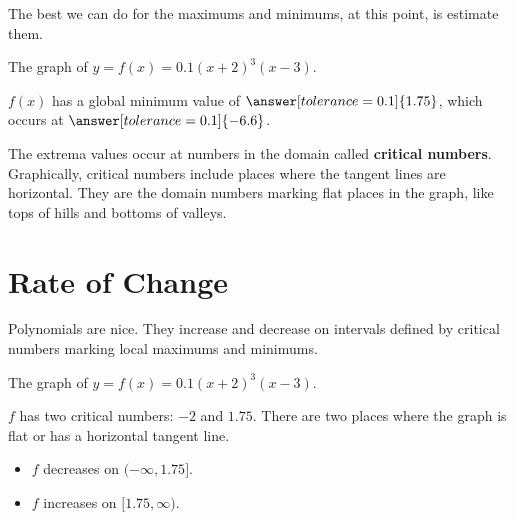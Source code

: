 \documentclass{ximera}
\begin{document}
The best we can do for the maximums and minimums, at this point, is estimate them.







\begin{example}

The graph of $y = f(x) = 0.1(x+2)^3(x-3)$.



\begin{center}
\end{center}



$f(x)$ has a global minimum value of $\answer[tolerance=0.1]{1.75}$, which occurs at $\answer[tolerance=0.1]{-6.6}$.


\end{example}




The extrema values occur at numbers in the domain called \textbf{critical numbers}.  Graphically, critical numbers include places where the tangent lines are horizontal.  They are the domain numbers marking flat places in the graph, like tops of hills and bottoms of valleys.

















\section{Rate of Change}



Polynomials are nice.  They increase and decrease on intervals defined by critical numbers marking local maximums and minimums.









\begin{example}

The graph of $y = f(x) = 0.1(x+2)^3(x-3)$.



\begin{center}
\end{center}



$f$ has two critical numbers: $-2$ and $1.75$. There are two places where the graph is flat or has a horizontal tangent line.

\begin{itemize}
\item $f$ decreases on $(-\infty, 1.75]$.
\item $f$ increases on $[1.75, \infty)$.
\end{itemize}




\end{example}
\end{document}
